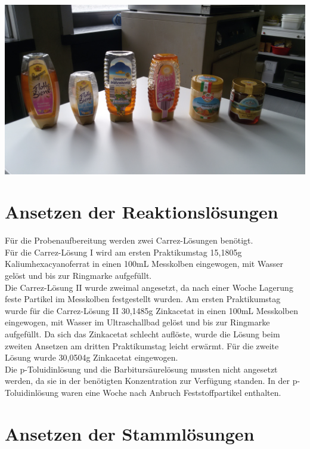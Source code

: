 \includegraphics{../Bilder/20150416_183117.jpg}

\section{Ansetzen der Reaktionslösungen}

Für die Probenaufbereitung werden zwei Carrez-Lösungen benötigt.\\ 
Für die Carrez-Lösung I wird am ersten Praktikumstag 15,1805g Kaliumhexacyanoferrat in einen 100mL Messkolben eingewogen, mit Wasser gelöst und bis zur Ringmarke aufgefüllt.\\ 
Die Carrez-Lösung II wurde zweimal angesetzt, da nach einer Woche Lagerung feste Partikel im Messkolben festgestellt wurden. Am ersten Praktikumstag wurde für die Carrez-Lösung II 30,1485g Zinkacetat in einen 100mL Messkolben eingewogen, mit Wasser im Ultraschallbad gelöst und bis zur Ringmarke aufgefüllt. Da sich das Zinkacetat schlecht auflöste, wurde die Lösung beim zweiten Ansetzen am dritten Praktikumstag leicht erwärmt. Für die zweite Lösung wurde 30,0504g Zinkacetat eingewogen.\\ 
Die p-Toluidinlösung und die Barbitursäurelösung mussten nicht angesetzt werden, da sie in der benötigten Konzentration zur Verfügung standen. In der p-Toluidinlösung waren eine Woche nach Anbruch Feststoffpartikel enthalten.

\section{Ansetzen der Stammlösungen}

